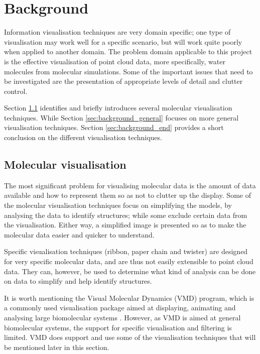 \graphicspath{{./background/}}

\chapter{Background}
\label{cha:background}


Information visualisation techniques are very domain specific; one type of
visualisation may work well for a specific scenario, but will work quite poorly
when applied to another domain. The problem domain applicable to this project
is the effective visualisation of point cloud data, more specifically, water
molecules from molecular simulations. Some of the important issues that need to
be investigated are the presentation of appropriate levels of detail and
clutter control.

Section \ref{sec:background_molecular} identifies and briefly introduces
several molecular visualisation techniques. While Section
\ref{sec:background_general} focuses on more general visualisation techniques.
Section \ref{sec:background_end} provides a short conclusion on the different
visualisation techniques.



\section{Molecular visualisation}
\label{sec:background_molecular}


The most significant problem for visualising molecular data is the amount of
data available and how to represent them so as not to clutter up the display.
Some of the molecular visualisation techniques focus on simplifying the models,
by analysing the data to identify structures; while some exclude certain data
from the visualisation. Either way, a simplified image is presented so as to
make the molecular data easier and quicker to understand.

Specific visualisation techniques (ribbon, paper chain and twister) are
designed for very specific molecular data, and are thus not easily extensible
to point cloud data. They can, however, be used to determine what kind of
analysis can be done on data to simplify and help identify structures.

It is worth mentioning the Visual Molecular Dynamics (VMD) \citep{humphrey96}
program, which is a commonly used visualisation package aimed at displaying,
animating and analysing large biomolecular systems \citep{VMD}. However, as VMD
is aimed at general biomolecular systems, the support for specific
visualisation and filtering is limited. VMD does support and use some of the
visualisation techniques that will be mentioned later in this section.

